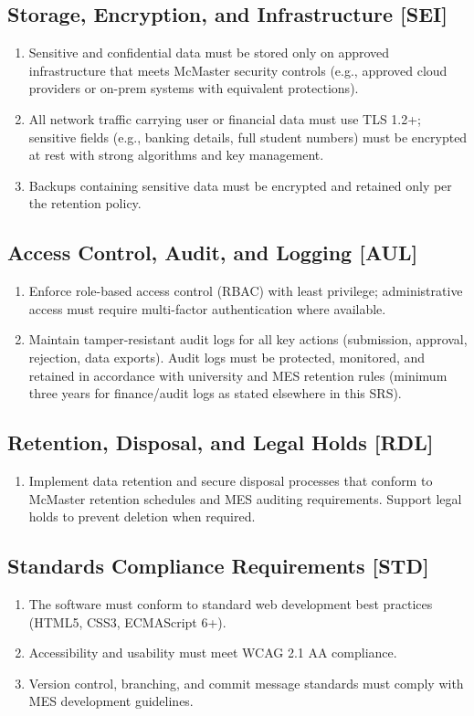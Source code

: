 \documentclass[12pt]{article}
\begin{document}
\subsection{Storage, Encryption, and Infrastructure [SEI]}
\begin{enumerate}
  \item Sensitive and confidential data must be stored only on approved infrastructure that meets McMaster security controls (e.g., approved cloud providers or on-prem systems with equivalent protections).
  \item All network traffic carrying user or financial data must use TLS 1.2+; sensitive fields (e.g., banking details, full student numbers) must be encrypted at rest with strong algorithms and key management.
  \item Backups containing sensitive data must be encrypted and retained only per the retention policy.
\end{enumerate}

\subsection{Access Control, Audit, and Logging [AUL]}
\begin{enumerate}
  \item Enforce role-based access control (RBAC) with least privilege; administrative access must require multi-factor authentication where available.
  \item Maintain tamper-resistant audit logs for all key actions (submission, approval, rejection, data exports). Audit logs must be protected, monitored, and retained in accordance with university and MES retention rules (minimum three years for finance/audit logs as stated elsewhere in this SRS).
\end{enumerate}

\subsection{Retention, Disposal, and Legal Holds [RDL]}
\begin{enumerate}
  \item Implement data retention and secure disposal processes that conform to McMaster retention schedules and MES auditing requirements. Support legal holds to prevent deletion when required.
\end{enumerate}

\subsection{Standards Compliance Requirements [STD]}
\begin{enumerate}
    \item The software must conform to standard web development best practices (HTML5, CSS3, ECMAScript 6+).
    \item Accessibility and usability must meet WCAG 2.1 AA compliance.
    \item Version control, branching, and commit message standards must comply with MES development guidelines.
\end{enumerate}
\end{document}

